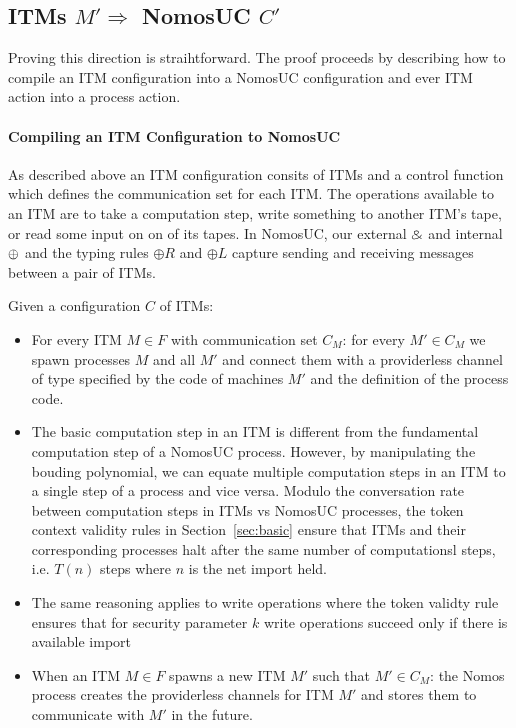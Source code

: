 \subsection{ITMs $M' \Rightarrow$ NomosUC $C'$}
Proving this direction is straihtforward. The proof proceeds by describing how to compile an ITM configuration into a NomosUC configuration and ever ITM action into a process action.

\paragraph{Compiling an ITM Configuration to NomosUC}
As described above an ITM configuration consits of ITMs and a control function which defines the communication set for each ITM.
The operations available to an ITM are to take a computation step, write something to another ITM's tape, or read some input on on of its tapes. 
In NomosUC, our external $\mathbin{\binampersand}$ and internal $\oplus$ and the typing rules $\oplus R$ and $\oplus L$ capture sending and receiving messages between a pair of ITMs. 


Given a configuration $C$ of ITMs:
\begin{itemize}
\item For every ITM $M \in F$ with communication set $C_M$: for every $M' \in C_M$ we spawn processes $M$ and all $M'$ and connect them with a providerless channel of type specified by the code of machines $M'$ and the definition of the process code.
\item The basic computation step in an ITM is different from the fundamental computation step of a NomosUC process. 
However, by manipulating the bouding polynomial, we can equate multiple computation steps in an ITM to a single step of a process and vice versa.
Modulo the conversation rate between computation steps in ITMs vs NomosUC processes, the token context validity rules in Section~\ref{sec:basic} ensure that ITMs and their corresponding processes halt after the same number of computationsl steps, i.e. $T(n)$ steps where $n$ is the net import held.
\item The same reasoning applies to write operations where the token validty rule ensures that for security parameter $k$ write operations succeed only if there is available import 
\item When an ITM $M \in F$ spawns a new ITM $M'$ such that $M' \in C_M$: the Nomos process creates the providerless channels for ITM $M'$ and stores them to communicate with $M'$ in the future.
\end{itemize}

